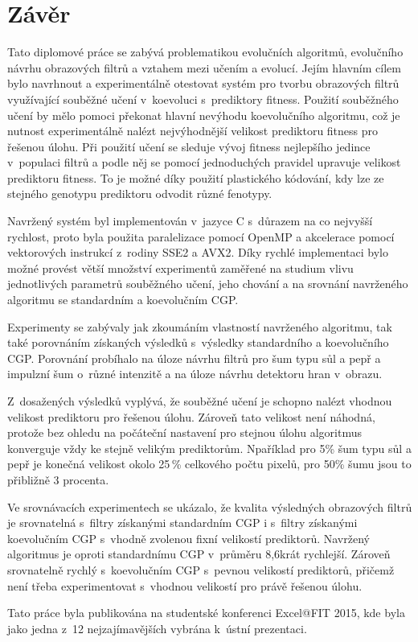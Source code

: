 \chapter{Závěr}
\label{chConclusions}

Tato diplomové práce se zabývá problematikou evolučních algoritmů, evolučního návrhu obrazových filtrů a vztahem mezi učením a evolucí. Jejím hlavním cílem bylo navrhnout a experimentálně otestovat systém pro tvorbu obrazových filtrů využívající souběžné učení v~koevoluci s~prediktory fitness. Použití souběžného učení by mělo pomoci překonat hlavní nevýhodu koevolučního algoritmu, což je nutnost experimentálně nalézt nejvýhodnější velikost prediktoru fitness pro řešenou úlohu. Při použití učení se sleduje vývoj fitness nejlepšího jedince v~populaci filtrů a podle něj se pomocí jednoduchých pravidel upravuje velikost prediktoru fitness. To je možné díky použití plastického  kódování, kdy lze ze stejného genotypu prediktoru odvodit různé fenotypy.

Navržený systém byl implementován v~jazyce C s~důrazem na co nejvyšší rychlost, proto byla použita paralelizace pomocí OpenMP a akcelerace pomocí vektorových instrukcí z~rodiny SSE2 a AVX2. Díky rychlé implementaci bylo možné provést větší množství experimentů zaměřené na studium vlivu jednotlivých parametrů souběžného učení, jeho chování a na srovnání navrženého algoritmu se standardním a koevolučním CGP.

Experimenty se zabývaly jak zkoumáním vlastností navrženého algoritmu, tak také porovnáním získaných výsledků s~výsledky standardního a koevolučního CGP. Porovnání probíhalo na úloze návrhu filtrů pro šum typu sůl a pepř a impulzní šum o~různé intenzitě a na úloze návrhu detektoru hran v~obrazu.

Z~dosažených výsledků vyplývá, že souběžné učení je schopno nalézt vhodnou velikost prediktoru pro řešenou úlohu. Zároveň tato velikost není náhodná, protože bez ohledu na počáteční nastavení pro stejnou úlohu algoritmus konverguje vždy ke stejně velikým prediktorům. Npaříklad pro 5\% šum typu sůl a pepř je konečná velikost okolo 25\,\% celkového počtu pixelů, pro 50\% šumu jsou to přibližně 3 procenta.

Ve srovnávacích experimentech se ukázalo, že kvalita výsledných obrazových filtrů je srovnatelná s~filtry získanými standardním CGP i s~filtry získanými koevolučním CGP s~vhodně zvolenou fixní velikostí prediktorů. Navržený algoritmus je oproti standardnímu CGP v~průměru 8,6krát rychlejší. Zároveň srovnatelně rychlý s~koevolučním CGP s~pevnou velikostí prediktorů, přičemž není třeba experimentovat s~vhodnou velikostí pro právě řešenou úlohu.

Tato práce byla publikována na studentské konferenci Excel@FIT 2015, kde byla jako jedna z~12 nejzajímavějších vybrána k~ústní prezentaci.
